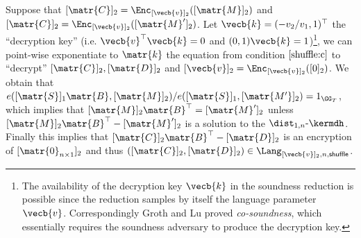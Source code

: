 Suppose that $[\matr{C}]_2=\Enc_{[\vecb{v}]_2}([\matr{M}]_2)$ and $[\matr{C}]_2=\Enc_{[\vecb{v}]_2}([\matr{M}']_2)$. Let $\vecb{k}=(-v_2/v_1,1)^\top$ the ``decryption key'' (i.e. $\vecb{v}^\top\vecb{k}=0$ and $(0,1)\vecb{k}=1$)\footnote{The availability of the decryption key $\vecb{k}$ in the soundness reduction is possible since the reduction samples by itself the language parameter $\vecb{v}$. Correspondingly Groth and Lu \cite{AC:GroLu07} proved \emph{co-soundness}, which essentially requires the soundness adversary to produce the decryption key.}, we can point-wise exponentiate to $\matr{k}$ the equation from condition $\ref{shuffle:c}$ to ``decrypt'' $[\matr{C}]_2,[\matr{D}]_2$ and $[\vecb{v}]_2=\Enc_{[\vecb{v}]_2}([0]_2)$. We obtain that
$e([\matr{S}]_1\matr{B},[\matr{M}]_2)/e([\matr{S}]_1,[\matr{M'}]_2)=1_{\GG_T}$, which implies that $[\matr{M}]_2\matr{B}^\top=[\matr{M}']_2$ unless $[\matr{M}]_2\matr{B}^\top-[\matr{M}']_2$ is a solution to the $\dist_{1,n}\mbox{-}\kermdh$. Finally this implies that $[\matr{C}]_2\matr{B}^\top-[\matr{D}]_2$ is an encryption of $[\matr{0}_{n\times 1}]_2$ and thus $([\matr{C}]_2,[\matr{D}]_2)\in\Lang_{[\vecb{v}]_2,n,\mathsf{shuffle}}$. 



